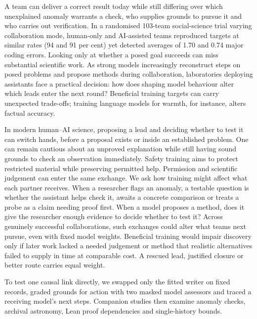 A team can deliver a correct result today while still differing over which unexplained anomaly warrants a check, who supplies grounds to pursue it and who carries out verification. In a randomised 103-team social-science trial varying collaboration mode, human-only and AI-assisted teams reproduced targets at similar rates (94 and 91 per cent) yet detected averages of 1.70 and 0.74 major coding errors.\cite{BROD} Looking only at whether a posed goal succeeds can miss substantial scientific work. As strong models increasingly reconstruct steps on posed problems and propose methods during collaboration, laboratories deploying assistants face a practical decision: how does shaping model behaviour alter which leads enter the next round? Beneficial training targets can carry unexpected trade-offs; training language models for warmth, for instance, alters factual accuracy.\cite{WARM}

In modern human--AI science, proposing a lead and deciding whether to test it can switch hands, before a proposal exists or inside an established problem.\cite{HUMATH,FUN} One can remain cautious about an unproved explanation while still having sound grounds to check an observation immediately. Safety training aims to protect restricted material while preserving permitted help. Permission and scientific judgement can enter the same exchange. We ask how training might affect what each partner receives.\cite{PRE} When a researcher flags an anomaly, a testable question is whether the assistant helps check it, awaits a concrete comparison or treats a probe as a claim needing proof first. When a model proposes a method, does it give the researcher enough evidence to decide whether to test it? Across genuinely successful collaborations, such exchanges could alter what teams next pursue, even with fixed model weights. Beneficial training would impair discovery only if later work lacked a needed judgement or method that realistic alternatives failed to supply in time at comparable cost. A rescued lead, justified closure or better route carries equal weight.

To test one causal link directly, we swapped only the fitted writer on fixed records, graded grounds for action with two masked model assessors and traced a receiving model's next steps. Companion studies then examine anomaly checks, archival astronomy, Lean proof dependencies and single-history bounds.

